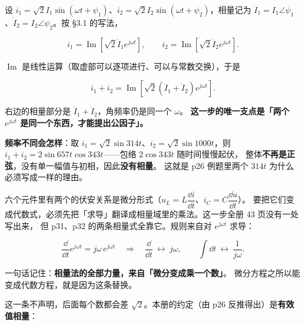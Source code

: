\documentclass[11pt]{ctexart}
\begin{document}
设 $i_1=\sqrt2I_1\sin(\omega t+\psi_1)$、$i_2=\sqrt2I_2\sin(\omega t+\psi_2)$，相量记为
$\dot I_1=I_1\angle\psi_1$、$\dot I_2=I_2\angle\psi_2$。按 §3.1 的写法，

\[ i_1=\operatorname{Im}\left[\sqrt2\dot I_1e^{j\omega t}\right],\qquad
   i_2=\operatorname{Im}\left[\sqrt2\dot I_2e^{j\omega t}\right] . \]

$\operatorname{Im}$ 是线性运算（取虚部可以逐项进行、可以与常数交换），于是

\[ i_1+i_2=\operatorname{Im}\left[\sqrt2\left(\dot I_1+\dot I_2\right)e^{j\omega t}\right] . \]

右边的相量部分是 $\dot I_1+\dot I_2$，角频率仍是同一个 $\omega$。
\textbf{这一步的唯一支点是「两个 $e^{j\omega t}$ 是同一个东西，才能提出公因子」。}

\textbf{频率不同会怎样}：取 $i_1=\sqrt2\sin314t$、$i_2=\sqrt2\sin1000t$，则
$i_1+i_2=2\sin657t\cos343t$——包络 $2\cos343t$ 随时间慢慢起伏，
整体\textbf{不再是正弦}，没有单一幅值与初相，因此\textbf{没有相量}。
这就是 p26 例题里两个 $314t$ 为什么必须写成一样的理由。



六个元件里有两个的伏安关系是微分形式（$u_L=L\dfrac{\dd i}{\dd t}$、$i_C=C\dfrac{\dd u}{\dd t}$）。
要把它们变成代数式，必须先把「求导」翻译成相量域里的乘法。这一步全册 43 页没有一处写出来，
但 p31、p32 的两条相量式全靠它。规则来自对 $e^{j\omega t}$ 求导：

\[ \frac{\dd}{\dd t}e^{j\omega t}=j\omega\,e^{j\omega t}
   \quad\Longrightarrow\quad
   \frac{\dd}{\dd t}\ \longleftrightarrow\ j\omega ,\qquad
   \int\dd t\ \longleftrightarrow\ \frac{1}{j\omega} . \]

一句话记住：\textbf{相量法的全部力量，来自「微分变成乘一个数」}。
微分方程之所以能变成代数方程，就是因为这条替换。



这一条不声明，后面每个数都会差 $\sqrt2$。本册的约定（由 p26 反推得出）是\textbf{有效值相量}：
\end{document}
